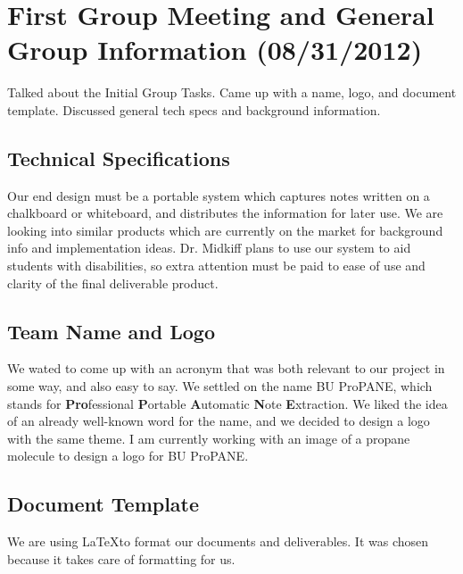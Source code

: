 \documentclass[]{article}
\begin{document}
			
			
	
	\section{First Group Meeting and General Group Information  (08/31/2012)}
		
		Talked about the Initial Group Tasks.  Came up with a name, logo, and document template.  Discussed general tech specs and background information.    
		
		\subsection*{Technical Specifications}
			Our end design must be a portable system which captures notes written on a chalkboard or whiteboard, and distributes the information for later use.  We are looking into similar products which are currently on the market for background info and implementation ideas.  Dr. Midkiff plans to use our system to aid students with disabilities, so extra attention must be paid to ease of use and clarity of the final deliverable product.      \\
		
		\subsection*{Team Name and Logo}
			We wated to come up with an acronym that was both relevant to our project in some way, and also easy to say. We settled on the name BU ProPANE, which stands for \textbf{Pro}fessional \textbf{P}ortable \textbf{A}utomatic \textbf{N}ote  \textbf{E}xtraction.  We liked the idea of an already well-known word for the name, and we decided to design a logo with the same theme.  I am currently working with an image of a propane molecule to design a logo for BU ProPANE.    \\
			
		\subsection*{Document Template}
			We are using \LaTeX to format our documents and deliverables.  It was chosen because it takes care of formatting for us.   \\
			
\end{document}
